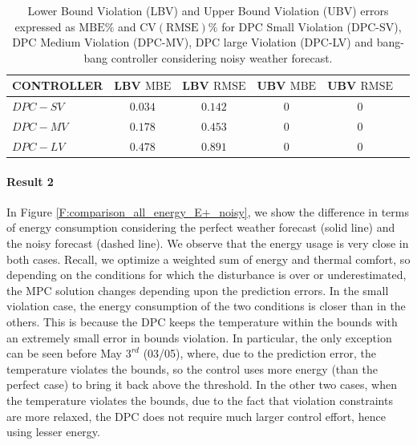 \begin{table}[t!]
	\centering
	\textcolor[rgb]{0,0,1}{\begin{tabular}{lccccc}
		\toprule
		CONTROLLER  & LBV $\mathrm{MBE}$  & LBV $\mathrm{RMSE}$ & UBV $\mathrm{MBE}$ & UBV $\mathrm{RMSE}$ 	\\ 
		\midrule
		$DPC-SV$    & $0.034$             & $0.142$  			      & $0$    				 & $0$     	  	\\
		$DPC-MV$    & $0.178$ 			  & $0.453$       			  & $0$    				 & $0$		  	\\
		$DPC-LV$    & $0.478$  			  & $0.891$     			  & $0$    				 & $0$	      	\\
		\bottomrule
	\end{tabular}}
	\caption{\textcolor[rgb]{0,0,1}{Lower Bound Violation (LBV) and Upper Bound Violation (UBV) errors expressed as $\mathrm{MBE}\%$ and $\mathrm{CV(RMSE)}\%$ for DPC Small Violation (DPC-SV), DPC Medium Violation (DPC-MV), DPC large Violation (DPC-LV) and bang-bang controller considering noisy weather forecast.}}
	\captionsetup{justification=centering}
	\label{T:violationErrorsNoisy}
\end{table}


\textcolor[rgb]{0,0,1}{\paragraph{Result 2} 
In Figure \ref{F:comparison_all_energy_E+_noisy}, we show the difference in terms of energy consumption considering the perfect weather forecast (solid line) and the noisy forecast (dashed line).
We observe that the energy usage is very close in both cases.
Recall, we optimize a weighted sum of energy and thermal comfort, so depending on the conditions for which the disturbance is over or underestimated, the MPC solution changes depending upon the prediction errors.
In the small violation case, the energy consumption of the two conditions is closer than in the others.
This is because the DPC keeps the temperature within the bounds with an extremely small error in bounds violation.
In particular, the only exception can be seen before May $3^{rd}$ (03/05), where, due to the prediction error, the temperature violates the bounds, so the control uses more energy (than the perfect case) to bring it back above the threshold.
In the other two cases, when the temperature violates the bounds, due to the fact that violation constraints are more relaxed, the DPC does not require much larger control effort, hence using lesser energy.}

